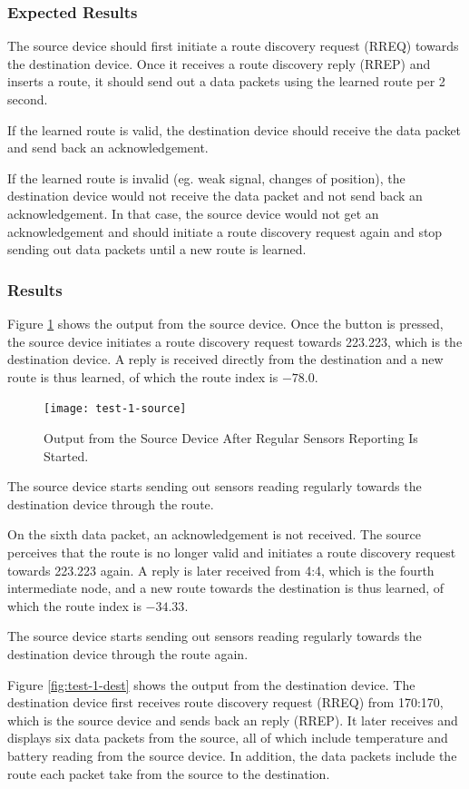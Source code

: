 \subsubsection{Expected Results}
The source device should first initiate a route discovery request (RREQ) towards the destination device.
Once it receives a route discovery reply (RREP) and inserts a route, it should send out a data packets using the learned route per 2 second.

If the learned route is valid, the destination device should receive the data packet and send back an acknowledgement.

If the learned route is invalid (eg. weak signal, changes of position), the destination device would not receive the data packet and not send back an acknowledgement.
In that case, the source device would not get an acknowledgement and should initiate a route discovery request again and stop sending out data packets until a new route is learned.

\subsubsection{Results}
Figure \ref{fig:test-1-source} shows the output from the source device.
Once the button is pressed, the source device initiates a route discovery request towards 223.223, which is the destination device.
A reply is received directly from the destination and a new route is thus learned, of which the route index is $-78.0$.

\begin{figure}
\centering
\texttt{[image: test-1-source]}
\caption{Output from the Source Device After Regular Sensors Reporting Is Started.}
\label{fig:test-1-source}
\end{figure}

The source device starts sending out sensors reading regularly towards the destination device through the route.

On the sixth data packet, an acknowledgement is not received. The source perceives that the route is no longer valid and initiates a route discovery request towards 223.223 again.
A reply is later received from 4:4, which is the fourth intermediate node, and a new route towards the destination is thus learned, of which the route index is $-34.33$.

The source device starts sending out sensors reading regularly towards the destination device through the route again.

Figure \ref{fig:test-1-dest} shows the output from the destination device.
The destination device first receives route discovery request (RREQ) from 170:170, which is the source device and sends back an reply (RREP).
It later receives and displays six data packets from the source, all of which include temperature and battery reading from the source device.
In addition, the data packets include the route each packet take from the source to the destination.

